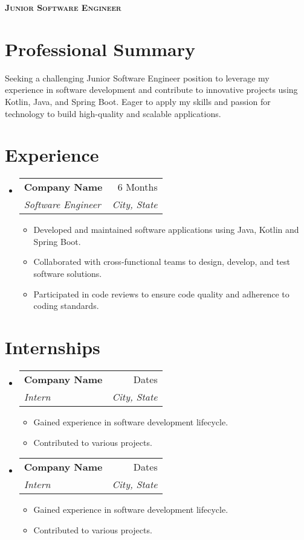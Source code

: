 \documentclass[letterpaper,11pt]{article}
\makeatletter
\newcommand{\resumeItem}[1]{
\item\small{
{#1 \vspace{-2pt}}
}
}
\newcommand{\resumeSubheading}[4]{
\vspace{-2pt}\item
\begin{tabular*}{0.97\textwidth}[t]{l@{\extracolsep{\fill}}r}
\textbf{#1} & #2 \\
\textit{\small#3} & \textit{\small #4} \\
\end{tabular*}\vspace{-7pt}
}
\newcommand{\resumeSubHeadingListStart}{\begin{itemize}[leftmargin=0.15in, label={}]}
\newcommand{\resumeSubHeadingListEnd}{\end{itemize}}
\newcommand{\resumeItemListStart}{\begin{itemize}}
\newcommand{\resumeItemListEnd}{\end{itemize}\vspace{-5pt}}
\makeatother
\begin{document}
\begin{center}
\textbf{\Huge \scshape Junior Software Engineer} \\ \vspace{1pt}
\end{center}


\section{Professional Summary} %
Seeking a challenging Junior Software Engineer position to leverage my experience in software development and contribute to innovative projects using Kotlin, Java, and Spring Boot. Eager to apply my skills and passion for technology to build high-quality and scalable applications.

\section{Experience}
\resumeSubHeadingListStart
\resumeSubheading{Company Name}{6 Months}{Software Engineer}{City, State}
\resumeItemListStart
\resumeItem{Developed and maintained software applications using Java, Kotlin and Spring Boot.}
\resumeItem{Collaborated with cross-functional teams to design, develop, and test software solutions.}
\resumeItem{Participated in code reviews to ensure code quality and adherence to coding standards.}
\resumeItemListEnd
\resumeSubHeadingListEnd

\section{Internships}
\resumeSubHeadingListStart
\resumeSubheading{Company Name}{Dates}{Intern}{City, State}
\resumeItemListStart
\resumeItem{Gained experience in software development lifecycle.}
\resumeItem{Contributed to various projects.}
\resumeItemListEnd
\resumeSubheading{Company Name}{Dates}{Intern}{City, State}
\resumeItemListStart
\resumeItem{Gained experience in software development lifecycle.}
\resumeItem{Contributed to various projects.}
\resumeItemListEnd
\resumeSubHeadingListEnd
\end{document}
